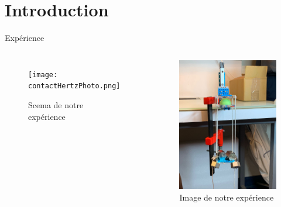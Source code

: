 \section{Introduction}

\begin{frame}{Expérience}
    \begin{columns}
        \begin{figure}
            \centering
            \texttt{[image: contactHertzPhoto.png]}
            \caption{Scema de notre expérience\cite{Wang2013}}
            \label{fig:wiki}
        \end{figure}
        \begin{figure}
            \centering
            \includegraphics[height=0.7\textheight]{Figures/IMG-20221205-WA0025.jpg}
            \caption{Image de notre expérience}
            \label{fig:my_label}
        \end{figure}
    \end{columns}
\end{frame}


